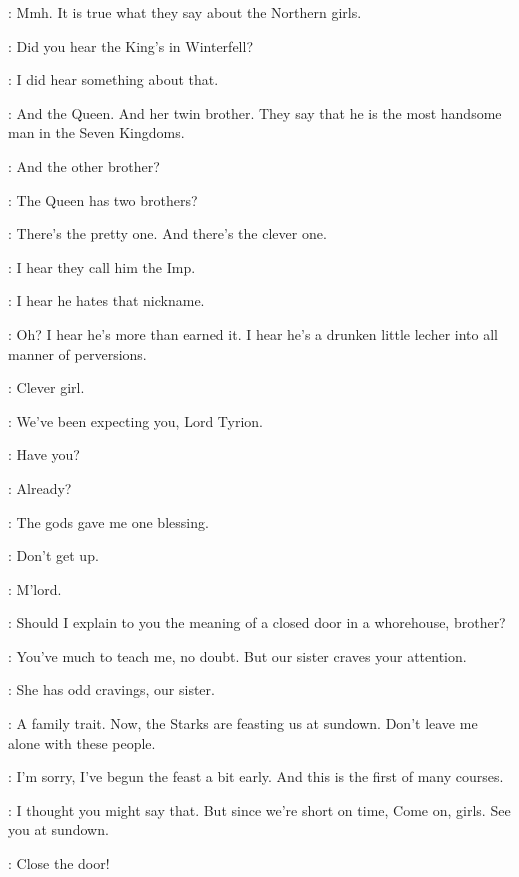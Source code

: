 \TYRION: Mmh. It is true what they say about the Northern girls. 

\ROS: Did you hear the King's in Winterfell? 

\TYRION: I did hear something about that. 

\ROS: And the Queen. And her twin brother. They say that he is the most handsome man in the Seven Kingdoms. 

\TYRION: And the other brother? 

\ROS: The Queen has two brothers? 

\TYRION: There's the pretty one. And there's the clever one. 

\ROS: I hear they call him the Imp. 

\TYRION: I hear he hates that nickname. 

\ROS: Oh? I hear he's more than earned it. I hear he's a drunken little lecher into all manner of perversions. 

\TYRION: Clever girl. 

\ROS: We've been expecting you, Lord Tyrion. 

\TYRION: Have you? 

\ROS:  Already?

\TYRION: The gods gave me one blessing. 


\JAIME: Don't get up. 

\ROS: M'lord. 

\TYRION: Should I explain to you the meaning of a closed door in a whorehouse, brother? 

\JAIME: You've much to teach me, no doubt. But our sister craves your attention. 

\TYRION: She has odd cravings, our sister. 

\JAIME: A family trait. Now, the Starks are feasting us at sundown. Don't leave me alone with these people. 

\TYRION: I'm sorry, I've begun the feast a bit early. And this is the first of many courses. 

\JAIME: I thought you might say that. But since we're short on time,  Come on, girls. See you at sundown. 


\TYRION: Close the door! 


\scene

